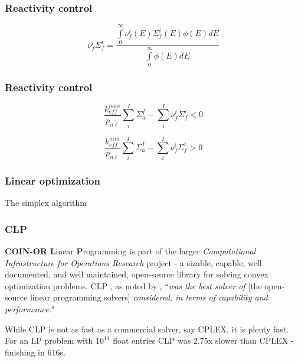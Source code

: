 \documentclass{beamer}
\begin{document}
\begin{frame}
\frametitle{Reactivity control}

    \begin{equation}
    \label{nufis}
        \nu_{f}^{i}\Sigma_{f}^{i} = \frac{\int\limits_{0}^{\infty}\nu_{f}^{i}(E)\Sigma_{f}^{i}(E)\phi(E)dE}{\int\limits_{0}^{\infty}\phi(E)dE}
    \end{equation}

\end{frame}

\begin{frame}
\frametitle{Reactivity control}

    \begin{equation}
    \label{max_reac}
        \frac{k_{eff}^{max}}{p_{n\ell}}\sum\limits_{i}^{I}\Sigma_{a}^{I} - \sum\limits_{i}^{I}\nu_{f}^{i}\Sigma_{f}^{i} < 0
    \end{equation}

    \begin{equation}
    \label{max_reac}
        \frac{k_{eff}^{min}}{p_{n\ell}}\sum\limits_{i}^{I}\Sigma_{a}^{I} - \sum\limits_{i}^{I}\nu_{f}^{i}\Sigma_{f}^{i} > 0   
    \end{equation}

\end{frame}

\begin{frame}
\frametitle{Linear optimization}

    The simplex algorithm

\end{frame}

\begin{frame}
\frametitle{CLP}

    \textbf{COIN-OR} \textbf{L}inear \textbf{P}rogramming is part of the larger
    \textit{Computational Infrastructure for Operations Research} project
    - a sizable, capable, well documented, and well maintained, open-source
     library for solving convex optimization problems. CLP
     , as noted by 
     \cite{gearhart_comparison_2013}, ``\textit{was the best solver of} [the open-source linear programming solvers] \textit{considered, in terms of
     capability and performance.}"

     \par

     While CLP is not as fast as a commercial solver, say CPLEX, it is plenty
     fast. For an LP problem with $10^{11}$ float entries CLP was 2.75x slower
     than CPLEX - finishing in 616s. 

\end{frame}
\end{document}

